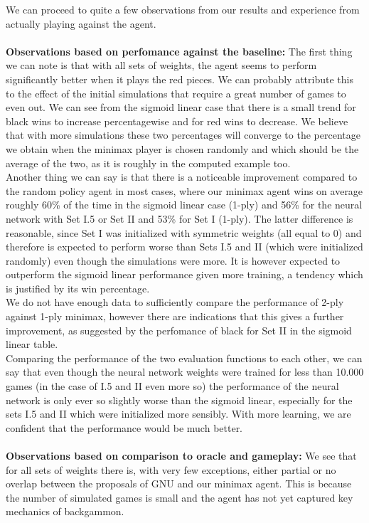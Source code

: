 \documentclass[11pt, a4paper, twoside]{amsart} %
\theoremstyle{definition}
\begin{document}
We can proceed to quite a few observations from our results and experience from actually playing against the agent.\\
\\
\textbf{Observations based on perfomance against the baseline: } The first thing we can note is that with all sets of weights, the agent seems to perform significantly better when it plays the red pieces. We can probably attribute this to the effect of the initial simulations that require a great number of games to even out. We can see from the sigmoid linear case that there is a small trend for black wins to increase percentagewise and for red wins to decrease. We believe that with more simulations these two percentages will converge to the percentage we obtain when the minimax player is chosen randomly and which should be the average of the two, as it is roughly in the computed example too.\\
Another thing we can say is that there is a noticeable improvement compared to the random policy agent in most cases, where our minimax agent wins on average roughly 60\% of the time in the sigmoid linear case (1-ply) and 56\% for the neural network with Set I.5 or Set II and 53\% for Set I (1-ply). The latter difference is reasonable, since Set I was initialized with symmetric weights (all equal to 0) and therefore is expected to perform worse than Sets I.5 and II (which were initialized randomly) even though the simulations were more. It is however expected to outperform the sigmoid linear performance given more training, a tendency which is justified by its win percentage.\\
We do not have enough data to sufficiently compare the performance of 2-ply against 1-ply minimax, however there are indications that this gives a further improvement, as suggested by the perfomance of black for Set II in the sigmoid linear table.\\
Comparing the performance of the two evaluation functions to each other, we can say that even though the neural network weights were trained for less than 10.000 games (in the case of I.5 and II even more so) the performance of the neural network is only ever so slightly worse than the sigmoid linear, especially for the sets I.5 and II which were initialized more sensibly. With more learning, we are confident that the performance would be much better.\\
\\
\textbf{Observations based on comparison to oracle and gameplay: } We see that for all sets of weights there is, with very few exceptions, either partial or no overlap between the proposals of GNU and our minimax agent. This is because the number of simulated games is small and the agent has not yet captured key mechanics of backgammon.\\
\end{document}
